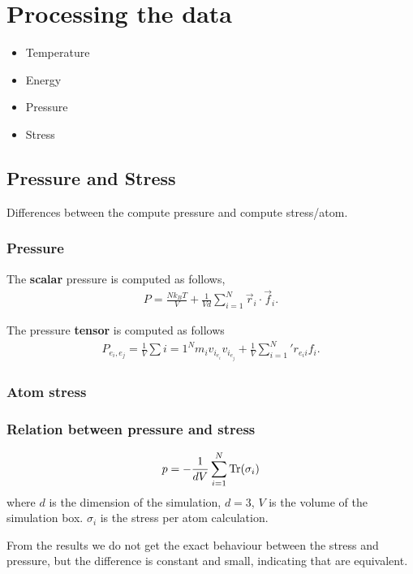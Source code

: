 \documentclass[main.tex]{subfiles}
\begin{document}
\section{Processing the data}

\begin{itemize}
    \item Temperature
    \item Energy
    \item Pressure
    \item Stress
\end{itemize}

\subsection{Pressure and Stress}

Differences between the compute pressure and compute stress/atom.

\subsubsection{Pressure}

The \textbf{scalar} pressure is computed as follows,
\begin{gather*}
    P=\frac{Nk_{B}T}{V}+\frac{1}{Vd}\sum_{i=1}^N\vec{r}_i\cdot\vec{f}_i.
\end{gather*}

The pressure \textbf{tensor} is computed as follows
\begin{gather*}
    P_{e_i,e_j}=\frac{1}{V}\sum{i=1}^{N}m_{i}v_{i_{e_i}}v_{i_{e_j}}+\frac{1}{V}\sum_{i=1}^N'r_{e_{i}i}f_{i}.
\end{gather*}



\subsubsection{Atom stress}

\subsubsection{Relation between pressure and stress}

\begin{gather*}
    p=-\frac{1}{dV}\sum_{i=1}^{N}\mathrm{Tr}\qty(\sigma_i)
\end{gather*}
where $d$ is the dimension of the simulation, $d=3$, $V$ is the volume of the simulation box.
$\sigma_i$ is the stress per atom calculation.

From the results we do not get the exact behaviour between the stress and pressure, but the difference is constant and small, indicating that are equivalent.
\end{document}
